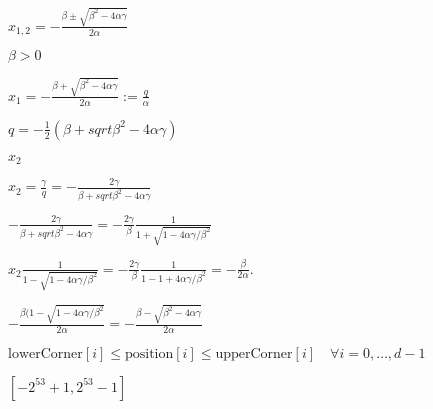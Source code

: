\documentclass{article}
\begin{document}
$ x_{1, 2} = - \frac{\beta \pm \sqrt{\beta^{2}-4\alpha\gamma}}{2\alpha}$
\pagebreak

$ \beta > 0 $
\pagebreak

$ x_{1} = - \frac{\beta + \sqrt{\beta^{2}-4\alpha\gamma}}{2\alpha} := \frac{q}{\alpha}$
\pagebreak

$ q= -\frac{1}{2}(\beta+sqrt{\beta^{2}-4\alpha\gamma})$
\pagebreak

$ x_{2} $
\pagebreak

$ x_{2} = \frac{\gamma}{q} = -\frac{2\gamma}{\beta+sqrt{\beta^{2}-4\alpha\gamma}}$
\pagebreak

$ -\frac{2\gamma}{\beta+sqrt{\beta^{2}-4\alpha\gamma}} = -\frac{2\gamma}{\beta}\frac{1}{1+\sqrt{1-4\alpha\gamma/\beta^{2}}}$
\pagebreak

$ x_{2}\frac{1}{1-\sqrt{1-4\alpha\gamma/\beta^{2}}} = -\frac{2\gamma}{\beta}\frac{1}{1-1+4\alpha\gamma/\beta^{2}}=-\frac{\beta}{2\alpha}.$
\pagebreak

$ -\frac{\beta(1-\sqrt{1-4\alpha\gamma/\beta^{2}}}{2\alpha} = - \frac{\beta - \sqrt{\beta^{2}-4\alpha\gamma}}{2\alpha} $
\pagebreak

$\text{lowerCorner}[i] \le \text{position}[i] \le \text{upperCorner}[i] \quad \forall i=0, \dots, d-1$
\pagebreak

$[-2^{53}+1, 2^{53}-1]$
\pagebreak
\end{document}
